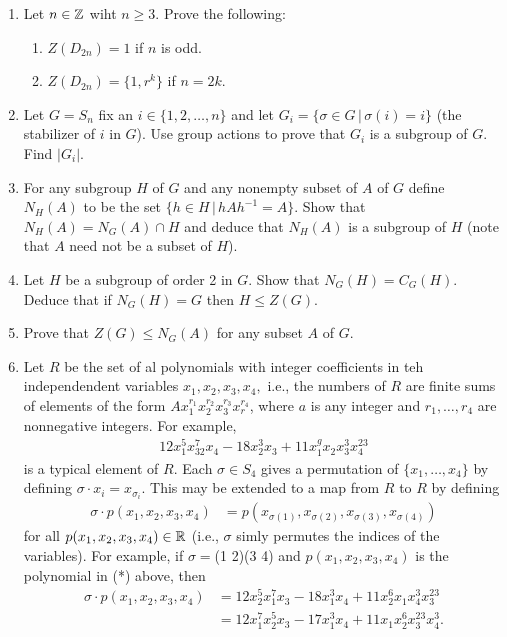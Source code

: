 \documentclass[10pt,a4paper]{report}
\begin{document}
\begin{enumerate}
\item Let $n \in \mathbb{Z}$ wiht $n \ge 3$.  Prove the following:
\begin{enumerate}
	\item $Z(D_{2n}) =1$ if $n$ is odd.
	\item $Z(D_{2n}) =\{1,r^k\}$ if $n=2k$.
\end{enumerate}

\item Let $G=S_n$ fix an $i \in \{1, 2, \dots, n\}$ and let $G_i=\{\sigma\in G\,|\,\sigma(i)=i\}$ (the stabilizer of $i$ in $G$).  Use group actions to prove that $G_i$ is a subgroup of $G$.  Find $|G_i|$.

\item For any subgroup $H$ of $G$ and any nonempty subset of $A$ of $G$ define $N_H(A)$ to be the set $\{h \in H\,|\,hAh^{-1}=A\}$.  Show that $N_H(A)=N_G(A)\cap H$ and deduce that $N_H(A)$ is a subgroup of $H$ (note that $A$ need not be a subset of $H$).

\item Let $H$ be a subgroup of order 2 in $G$.  Show that $N_G(H)=C_G(H)$.  Deduce that if $N_G(H)=G$ then $H \le Z(G)$.

\item Prove that $Z(G) \le N_G(A)$ for any subset $A$ of $G$.

\item Let $R$ be the set of al polynomials with integer coefficients in teh independendent variables $x_1, x_2, x_3, x_4,$ i.e., the numbers of $R$ are finite sums of elements of the form $Ax_1^{r_1}x_2^{r_2}x_3^{r_3}x_r^{r_4}$, where $a$ is any integer and $r_1, \dots, r_4$ are nonnegative integers.  For example,
\begin{align*}
	12x_1^5x_32^7x_4-18x_2^3x_3+11x_1^gx_2x_3^3x_4^{23}
\end{align*}is a typical element of $R$.  Each $\sigma \in S_4$ gives a permutation of $\{x_1, \dots, x_4\}$ by defining $\sigma \cdot x_i=x_{\sigma_i}$.  This may be extended to a map from $R$ to $R$ by defining
\begin{align*}
	\sigma\cdot p(x_1,x_2,x_3,x_4) &= p(x_{\sigma(1)},x_{\sigma(2)},x_{\sigma(3)},x_{\sigma(4)})
\end{align*}for all $p(x_1,x_2,x_3,x_4) \in \mathbb{R}$ (i.e., $\sigma$ simly permutes the indices of the variables).  For example, if $\sigma = $(1 2)(3 4) and $p(x_1,x_2,x_3,x_4)$ is the polynomial in (*) above, then 
\begin{align*}
	\sigma\cdot p(x_1,x_2,x_3,x_4)& = 12x_2^5x_1^7x_3-18x_1^3x_4+11x_2^6x_1x_4^3x_3^{23}\\
		&=12x_1^7x_2^5x_3-17x_1^3x_4+11x_1x_2^6x_3^{23}x_4^3.
\end{align*}


\end{enumerate}
\end{document}

